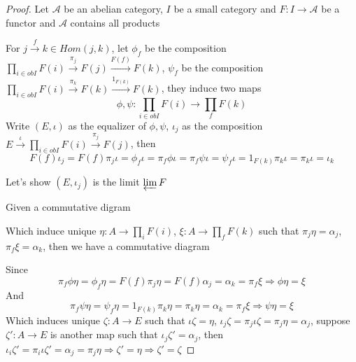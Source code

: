 \documentclass[../main.tex]{subfiles}
\begin{document}
\begin{proof}
Let $\mathcal A$ be an abelian category, $I$ be a small category and $F:I\to\mathcal A$ be a functor and $\mathcal A$ contains all products \par
For $j\xrightarrow{f}k\in Hom(j,k)$, let $\phi_f$ be the composition $\displaystyle\prod_{i\in obI}F(i)\xrightarrow{\pi_j} F(j)\xrightarrow{F(f)} F(k)$, $\psi_f$ be the composition $\displaystyle\prod_{i\in obI}F(i)\xrightarrow{\pi_k} F(k)\xrightarrow{1_{F(k)}} F(k)$, they induce two maps
\[\displaystyle \phi,\psi:\prod_{i\in obI}F(i)\to\prod_{f}F(k)\]
Write $(E,\iota)$ as the equalizer of $\phi,\psi$, $\iota_j$ as the composition $\displaystyle E\xrightarrow{\iota}\prod_{i\in obI}F(i)\xrightarrow{\pi_j} F(j)$, then
\[F(f)\iota_j=F(f)\pi_j\iota=\phi_f\iota=\pi_f\phi\iota=\pi_f\psi\iota=\psi_f\iota=1_{F(k)}\pi_k\iota=\pi_k\iota=\iota_k\]
\begin{center}
\end{center}
Let's show $(E,\iota_j)$ is the limit $\varprojlim F$ \par
Given a commutative digram
\begin{center}
\end{center}
Which induce unique $\eta:A\to\prod_iF(i)$, $\xi:A\to\prod_fF(k)$ such that $\pi_j\eta=\alpha_j$, $\pi_f\xi=\alpha_k$, then we have a commutative diagram
\begin{center}
\end{center}
Since
\[\pi_f\phi\eta=\phi_f\eta=F(f)\pi_j\eta=F(f)\alpha_j=\alpha_k=\pi_f\xi\Rightarrow\phi\eta=\xi\]
And
\[\pi_f\psi\eta=\psi_f\eta=1_{F(k)}\pi_k\eta=\pi_k\eta=\alpha_k=\pi_f\xi\Rightarrow\psi\eta=\xi\]
Which induces unique $\zeta:A\to E$ such that $\iota\zeta=\eta$, $\iota_j\zeta=\pi_j\iota\zeta=\pi_j\eta=\alpha_j$, suppose $\zeta':A\to E$ is another map such that $\iota_j\zeta'=\alpha_j$, then $\iota_i\zeta'=\pi_i\iota\zeta'=\alpha_j=\pi_j\eta\Rightarrow\zeta'=\eta\Rightarrow\zeta'=\zeta$
\end{proof}
\end{document}
